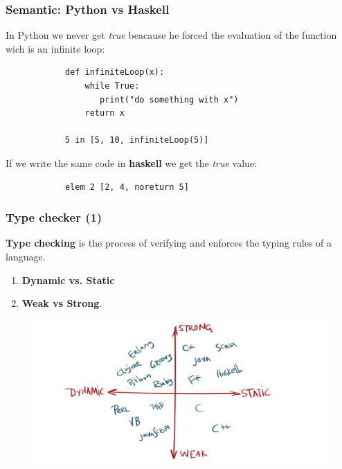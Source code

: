 \documentclass[xcolor ={table,usenames,dvipsnames}]{beamer}
\theoremstyle{definition}
\begin{document}
	\begin{frame}[fragile]
		\frametitle{Semantic: Python vs Haskell}
		In Python we never get \textit{true} beacause  he forced the evaluation of the function wich is an infinite loop:
		\begin{lstlisting}
			def infiniteLoop(x):
			    while True:
		           print("do something with x")
		        return x
				
			5 in [5, 10, infiniteLoop(5)]
		\end{lstlisting}
		If we write the same code in \textbf{haskell} we get the \textit{true} value:
		\begin{lstlisting}
			elem 2 [2, 4, noreturn 5]
		\end{lstlisting}
	\end{frame}

	\begin{frame}
		\frametitle{Type checker (1)}
			\textbf{Type checking} is the process of verifying and enforces the typing rules of a language.
		\begin{enumerate}
			\item \textbf{Dynamic vs. Static}
			\item \textbf{Weak vs Strong}.
		\end{enumerate}
		
		\begin{figure}[h!]
			\centering
			\includegraphics[scale=0.14]{img/classification.png}
		\end{figure}
	\end{frame}
\end{document}
